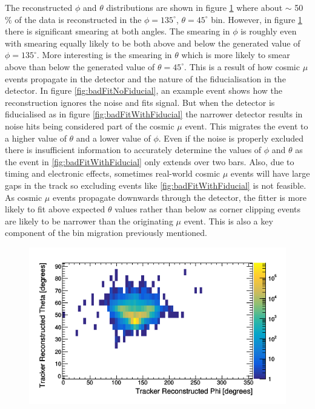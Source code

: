 The reconstructed $\phi$ and $\theta$ distributions are shown in figure \ref{fig:pVsTWithDeadLog} where about $\sim$ 50\,\% of the data is reconstructed in the $\phi = 135^\circ$, $\theta = 45^\circ$ bin. However, in figure \ref{fig:pVsTWithDeadLog} there is significant smearing at both angles. The smearing in $\phi$ is roughly even with smearing equally likely to be both above and below the generated value of $\phi = 135^\circ$. More interesting is the smearing in $\theta$ which is more likely to smear above than below the generated value of $\theta = 45^\circ$. This is a result of how cosmic $\mu$ events propagate in the detector and the nature of the fiducialisation in the detector. In figure \ref{fig:badFitNoFiducial}, an example event shows how the reconstruction ignores the noise and fits signal. But when the detector is fiducialised as in figure \ref{fig:badFitWithFiducial} the narrower detector results in noise hits being considered part of the cosmic $\mu$ event. This migrates the event to a higher value of $\theta$ and a lower value of $\phi$. Even if the noise is properly excluded there is insufficient information to accurately determine the values of $\phi$ and $\theta$ as the event in \ref{fig:badFitWithFiducial} only extends over two bars. Also, due to timing and electronic effects, sometimes real-world cosmic $\mu$ events will have large gaps in the track so excluding events like \ref{fig:badFitWithFiducial} is not feasible. As cosmic $\mu$ events propagate downwards through the detector, the fitter is more likely to fit above expected $\theta$ values rather than below as corner clipping events are likely to be narrower than the originating $\mu$ event. This is also a key component of the bin migration previously mentioned. 

\begin{figure}[!h]
 \centering
 \includegraphics[width=0.7\linewidth]{Chapter5/Figs/cosmicTrackerUncertainties/pVsTWithDeadLog.png}
 \label{fig:pVsTWithDeadLog}
\end{figure}

